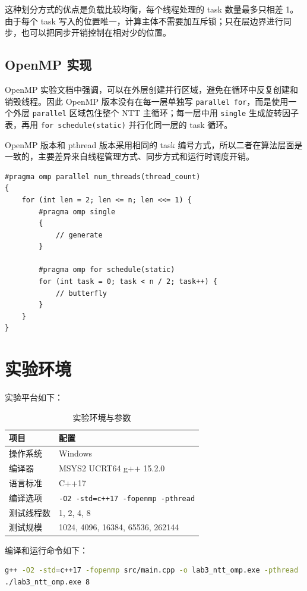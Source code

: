 \documentclass[a4paper,12pt]{ctexart}
\begin{document}
这种划分方式的优点是负载比较均衡，每个线程处理的 task 数量最多只相差 1。由于每个 task 写入的位置唯一，计算主体不需要加互斥锁；只在层边界进行同步，也可以把同步开销控制在相对少的位置。

\subsection{OpenMP 实现}

OpenMP 实验文档中强调，可以在外层创建并行区域，避免在循环中反复创建和销毁线程。因此 OpenMP 版本没有在每一层单独写 \texttt{parallel for}，而是使用一个外层 \texttt{parallel} 区域包住整个 NTT 主循环；每一层中用 \texttt{single} 生成旋转因子表，再用 \texttt{for schedule(static)} 并行化同一层的 task 循环。

OpenMP 版本和 pthread 版本采用相同的 task 编号方式，所以二者在算法层面是一致的，主要差异来自线程管理方式、同步方式和运行时调度开销。

\begin{lstlisting}[title=OpenMP 核心循环]
#pragma omp parallel num_threads(thread_count)
{
    for (int len = 2; len <= n; len <<= 1) {
        #pragma omp single
        {
            // generate
        }

        #pragma omp for schedule(static)
        for (int task = 0; task < n / 2; task++) {
            // butterfly
        }
    }
}
\end{lstlisting}

\section{实验环境}

实验平台如下：

\begin{table}[H]
\centering
\begin{tabular}{ll}
\toprule
项目 & 配置 \\
\midrule
操作系统 & Windows \\
编译器 & MSYS2 UCRT64 g++ 15.2.0 \\
语言标准 & C++17 \\
编译选项 & \texttt{-O2 -std=c++17 -fopenmp -pthread} \\
测试线程数 & 1, 2, 4, 8 \\
测试规模 & 1024, 4096, 16384, 65536, 262144 \\
\bottomrule
\end{tabular}
\caption{实验环境与参数}
\end{table}

编译和运行命令如下：
\begin{lstlisting}[language=bash]
g++ -O2 -std=c++17 -fopenmp src/main.cpp -o lab3_ntt_omp.exe -pthread
./lab3_ntt_omp.exe 8
\end{lstlisting}
\end{document}
